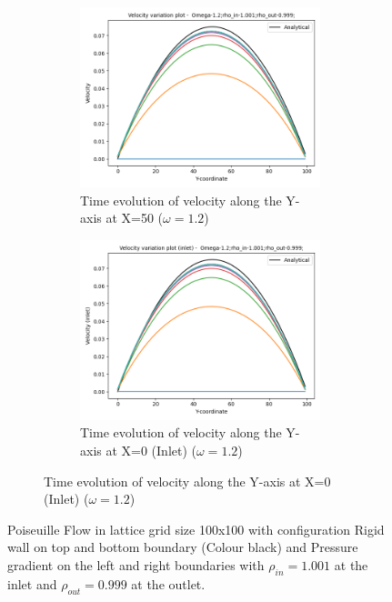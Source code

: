\documentclass[a4paper,11pt]{report}
\begin{document}
\begin{figure}[h!]
\begin{subfigure}{\textwidth}
    \begin{subfigure}{0.5\textwidth}
        \centering
        \includegraphics[width=0.8\linewidth]{HPC_report/images/poiseuille/o12/Combined_plot-Y-coordinate-Velocity.png}
        \captionsetup{font=small}
        \caption{Time evolution of velocity along the Y-axis at X=50 ($\omega = 1.2$)}
        \label{fig:p_velocity_2}
    \end{subfigure}
    \begin{subfigure}{0.5\textwidth}
        \includegraphics[width=0.8\linewidth]{HPC_report/images/poiseuille/o12/Combined_plot-Y-coordinate-Velocity (inlet).png}
        \captionsetup{font=small}
        \caption{Time evolution of velocity along the Y-axis at X=0 (Inlet) ($\omega = 1.2$)}
        \label{fig:p_velocity_inlet_2}
    \end{subfigure}
\end{subfigure}
    \caption{Poiseuille Flow in lattice grid size 100x100 with configuration Rigid wall on top and bottom boundary (Colour black) and Pressure gradient on the left and right boundaries with $\rho_{in}=1.001$ at the inlet and $\rho_{out}=0.999$ at the outlet. }
\end{figure} 
\end{document}
